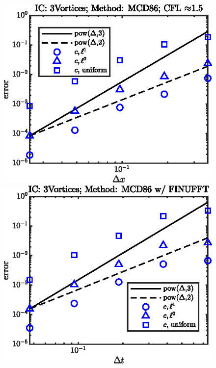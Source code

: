 \documentclass[11pt,letterpaper]{article}
\begin{document}
\begin{figure}[H]
    \includegraphics{figs/nonlin_conv_order_3Vortices_MCD86}
    \includegraphics{figs/nonlin_conv_order_3Vortices_finu_MCD86}
    \caption{}\label{fig:nonlin_conv_order_Taylor_MCD86}
\end{figure}
\end{document}
